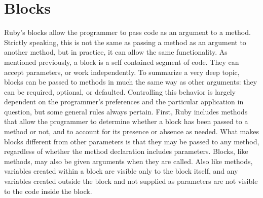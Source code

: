 \documentclass[12pt]{article}
\begin{document}
\section{Blocks}\label{blocks}
Ruby's blocks allow the programmer to pass code as an argument to a method. Strictly speaking, this is not the same as passing a method as an argument to another method, but in practice, it can allow the same functionality\cite{mixandgo}. As mentioned previously, a block is a self contained segment of code. They can accept parameters, or work independently.
To summarize a very deep topic, blocks can be passed to methods in much the same way as other arguments: they can be required, optional, or defaulted. Controlling this behavior is largely dependent on the programmer's preferences and the particular application in question, but some general rules always pertain. First, Ruby includes methods that allow the programmer to determine whether a block has been passed to a method or not, and to account for its presence or absence as needed. What makes blocks different from other parameters is that they may be passed to any method, regardless of whether the method declaration includes parameters. Blocks, like methods, may also be given arguments when they are called. Also like methods, variables created within a block are visible only to the block itself, and any variables created outside the block and not supplied as parameters are not visible to the code inside the block\cite{mixandgo}.

\pagebreak
\nocite{*}

{}
\end{document}

